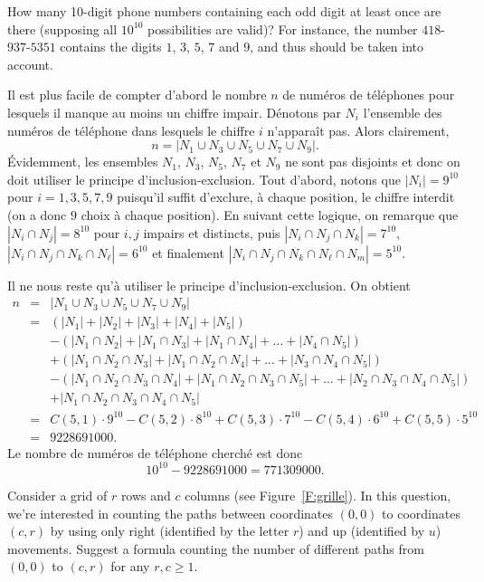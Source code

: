 \documentclass[12pt,addpoints]{exam}
\begin{document}
\begin{questions}
\question
How many 10-digit phone numbers containing each odd digit at least once are there (supposing all $10^{10}$ possibilities are valid)? For instance, the number $418$-$937$-$5351$ contains the digits $1$, $3$, $5$, $7$ and $9$, and thus should be taken into account.
\begin{solution}
Il est plus facile de compter d'abord le nombre $n$ de numéros de téléphones pour lesquels il manque au moins un chiffre impair. Dénotons par $N_i$ l'ensemble des numéros de téléphone dans lesquels le chiffre $i$ n'apparaît pas. Alors clairement, 
$$n = \left| N_1 \cup N_3 \cup N_5 \cup N_7 \cup N_9 \right|.$$
Évidemment, les ensembles $N_1$, $N_3$, $N_5$, $N_7$ et $N_9$ ne sont pas disjoints et donc on doit utiliser le principe d'inclusion-exclusion. Tout d'abord, notons que $|N_i| = 9^{10}$ pour $i = 1,3,5,7,9$ puisqu'il suffit d'exclure, à chaque position, le chiffre interdit (on a donc $9$ choix à chaque position). En suivant cette logique, on remarque que $|N_i \cap N_j| = 8^{10}$ pour $i,j$ impairs et distincts, puis $|N_i \cap N_j \cap N_k| = 7^{10}$, $|N_i \cap N_j \cap N_k \cap N_\ell| = 6^{10}$ et finalement $|N_i \cap N_j \cap N_k \cap N_\ell \cap N_m| = 5^{10}$.

Il ne nous reste qu'à utiliser le principe d'inclusion-exclusion. On obtient
\begin{eqnarray*}
  n & = & \left| N_1 \cup N_3 \cup N_5 \cup N_7 \cup N_9 \right| \\
    & = & (|N_1| + |N_2| + |N_3| + |N_4| + |N_5|) \\
    &   & - (|N_1 \cap N_2| + |N_1 \cap N_3| + |N_1 \cap N_4| + \ldots + |N_4 \cap N_5|) \\
    &   & + (|N_1 \cap N_2 \cap N_3| + |N_1 \cap N_2 \cap N_4| + \ldots + |N_3 \cap N_4 \cap N_5|) \\
    &   & - (|N_1 \cap N_2 \cap N_3 \cap N_4| + |N_1 \cap N_2 \cap N_3 \cap N_5| + \ldots + |N_2 \cap N_3 \cap N_4 \cap N_5|) \\
    &   & + |N_1 \cap N_2 \cap N_3 \cap N_4 \cap N_5| \\
    & = & C(5,1) \cdot 9^{10} - C(5,2) \cdot 8^{10} + C(5,3) \cdot 7^{10} - C(5,4) \cdot 6^{10} + C(5,5) \cdot 5^{10} \\
    & = & 9228691000.
\end{eqnarray*}
Le nombre de numéros de téléphone cherché est donc
$$10^{10} - 9228691000 = 771309000.$$
\end{solution}

\question
Consider a grid of $r$ rows and $c$ columns (see Figure~\ref{F:grille}). In this question, we're interested in counting the paths between coordinates $(0,0)$ to coordinates $(c,r)$ by using only right (identified by the letter $r$) and up (identified by $u$) movements. Suggest a formula counting the number of different paths from $(0,0)$ to $(c,r)$ for any $r,c \geq 1$.


\end{questions}
\end{document}
